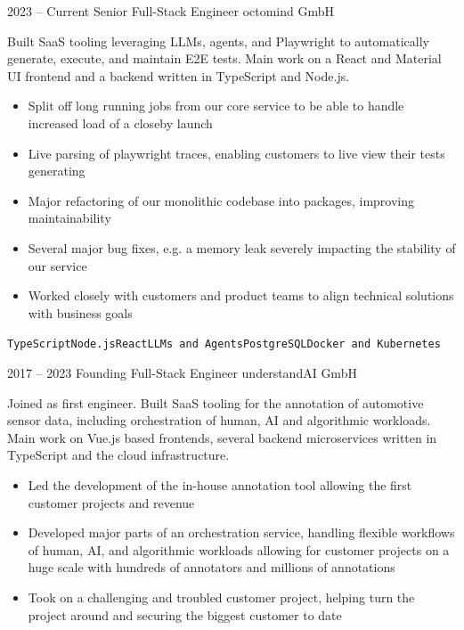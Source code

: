 \documentclass[8pt]{developercv} %
\newcommand{\linebreaksmall}{\vspace{2mm}}
\begin{document}

\begin{entrylist}
	\entry
		{2023 -- Current}
		{Senior Full-Stack Engineer}
		{octomind GmbH}
		{Built SaaS tooling leveraging LLMs, agents, and Playwright to automatically generate, execute, and maintain E2E tests. Main work on a React and Material UI frontend and a backend written in TypeScript and Node.js.
		\begin{itemize}[nosep, topsep=0pt, left=5pt, after=\vspace{6pt}]
			\item Split off long running jobs from our core service to be able to handle increased load of a closeby launch
			\item Live parsing of playwright traces, enabling customers to live view their tests generating
			\item Major refactoring of our monolithic codebase into packages, improving maintainability
			\item Several major bug fixes, e.g. a memory leak severely impacting the stability of our service
			\item Worked closely with customers and product teams to align technical solutions with business goals
		\end{itemize}
		\texttt{TypeScript}\slashsep\texttt{Node.js}\slashsep\texttt{React}\slashsep\texttt{LLMs and Agents}\slashsep\texttt{PostgreSQL}\slashsep\texttt{Docker and Kubernetes}} \linebreaksmall
	\entry
		{2017 -- 2023}
		{Founding Full-Stack Engineer}
		{understandAI GmbH}
		{Joined as first engineer. Built SaaS tooling for the annotation of automotive sensor data, including orchestration of human, AI and algorithmic workloads. Main work on Vue.js based frontends, several backend microservices written in TypeScript and the cloud infrastructure.
		\begin{itemize}[nosep, topsep=0pt, left=5pt, after=\vspace{6pt}]
			\item Led the development of the in-house annotation tool allowing the first customer projects and revenue
			\item Developed major parts of an orchestration service, handling flexible workflows of human, AI, and algorithmic workloads allowing for customer projects on a huge scale with hundreds of annotators and millions of annotations
			\item Took on a challenging and troubled customer project, helping turn the project around and securing the biggest customer to date

\end{itemize}}
\end{entrylist}
\end{document}
